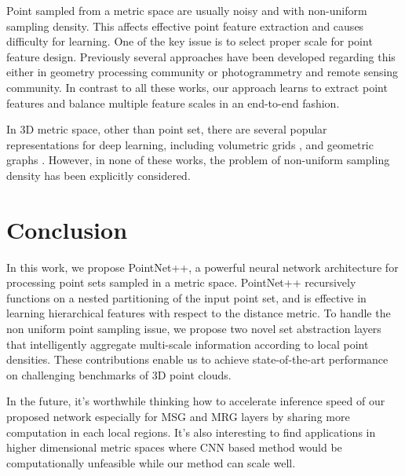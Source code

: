 \documentclass{article}
\begin{document}
Point sampled from a metric space are usually noisy and with non-uniform sampling density. This affects effective point feature extraction and causes difficulty for learning. One of the key issue is to select proper scale for point feature design. Previously several approaches have been developed regarding this \cite{pauly2006point, mitra2004estimating, belton2006classification,demantke2011dimensionality, gressin2013towards,weinmann2015semantic} either in geometry processing community or photogrammetry and remote sensing community.
In contrast to all these works, our approach learns to extract point features and balance multiple feature scales in an end-to-end fashion.

In 3D metric space, other than point set, there are several popular representations for deep learning, including volumetric grids \cite{qi2016volumetric,riegler2016octnet,wang2017cnn}, and geometric graphs \cite{bruna2013spectral,masci2015geodesic,yi2016syncspeccnn}. However, in none of these works, the problem of non-uniform sampling density has been explicitly considered.













%
 
\vspace{-0.1cm}
\section{Conclusion}
In this work, we propose PointNet++, a powerful neural network architecture for processing point sets sampled in a metric space. PointNet++ recursively functions on a nested partitioning of the input point set, and is effective in learning hierarchical features with respect to the distance metric. To handle the non uniform point sampling issue, we propose two novel set abstraction layers that intelligently aggregate multi-scale information according to local point densities. These contributions enable us to achieve state-of-the-art performance on challenging benchmarks of 3D point clouds.

In the future, it's worthwhile thinking how to accelerate inference speed of our proposed network especially for MSG and MRG layers by sharing more computation in each local regions. It's also interesting to find applications in higher dimensional metric spaces where CNN based method would be computationally unfeasible while our method can scale well.
%
 \vspace{-0.1cm}
{\small


}
\newpage
\appendix
\end{document}
